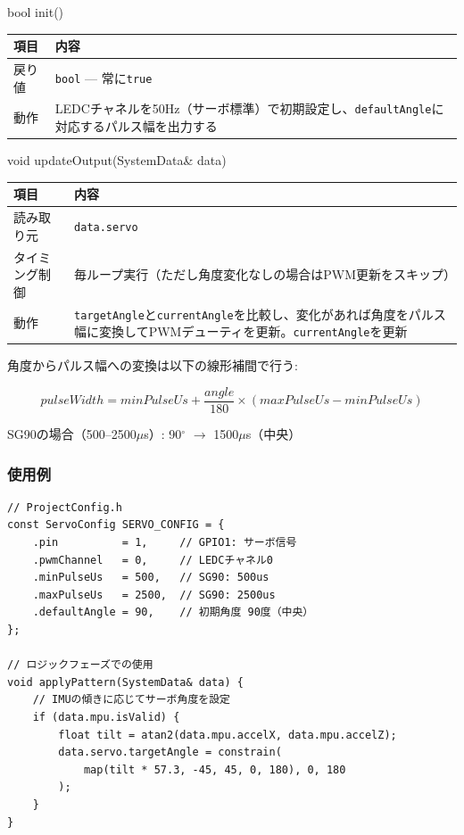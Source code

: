 \begin{funcblock}{bool init()}
\begin{tabularx}{\textwidth}{l X}
\toprule
\textbf{項目} & \textbf{内容} \\
\midrule
戻り値   & \texttt{bool} --- 常に\texttt{true} \\
動作     & LEDCチャネルを50Hz（サーボ標準）で初期設定し、\texttt{defaultAngle}に対応するパルス幅を出力する \\
\bottomrule
\end{tabularx}
\end{funcblock}

\begin{funcblock}{void updateOutput(SystemData\& data)}
\begin{tabularx}{\textwidth}{l X}
\toprule
\textbf{項目} & \textbf{内容} \\
\midrule
読み取り元     & \texttt{data.servo} \\
タイミング制御 & 毎ループ実行（ただし角度変化なしの場合はPWM更新をスキップ） \\
動作           & \texttt{targetAngle}と\texttt{currentAngle}を比較し、変化があれば角度をパルス幅に変換してPWMデューティを更新。\texttt{currentAngle}を更新 \\
\bottomrule
\end{tabularx}
\end{funcblock}

\begin{notebox}[角度→パルス幅変換]
角度からパルス幅への変換は以下の線形補間で行う:

\vspace{0.3em}
$$pulseWidth = minPulseUs + \frac{angle}{180} \times (maxPulseUs - minPulseUs)$$
\vspace{0.3em}

\noindent SG90の場合（500--2500$\mu$s）: 90$^{\circ}$ $\rightarrow$ 1500$\mu$s（中央）
\end{notebox}

\subsubsection{使用例}

\begin{lstlisting}[style=cppstyle, caption={ServoModuleの使用例}]
// ProjectConfig.h
const ServoConfig SERVO_CONFIG = {
    .pin          = 1,     // GPIO1: サーボ信号
    .pwmChannel   = 0,     // LEDCチャネル0
    .minPulseUs   = 500,   // SG90: 500us
    .maxPulseUs   = 2500,  // SG90: 2500us
    .defaultAngle = 90,    // 初期角度 90度（中央）
};

// ロジックフェーズでの使用
void applyPattern(SystemData& data) {
    // IMUの傾きに応じてサーボ角度を設定
    if (data.mpu.isValid) {
        float tilt = atan2(data.mpu.accelX, data.mpu.accelZ);
        data.servo.targetAngle = constrain(
            map(tilt * 57.3, -45, 45, 0, 180), 0, 180
        );
    }
}
\end{lstlisting}
